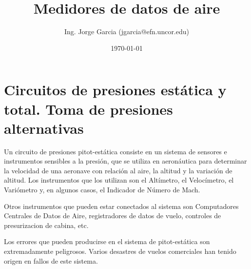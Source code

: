 \documentclass[a4paper,12pt,twoside]{article}
\title{Medidores de datos de aire}
\author{Ing. Jorge Garcia (jgarcia@efn.uncor.edu)}
\date{\today}
\begin{document}
\renewcommand{\tablename}{Tabla}

\newcommand{\ESPACIO}{\rule{0in}{3ex}}

\thispagestyle{fancy}
\maketitle

\thispagestyle{fancy}
\tableofcontents


\newpage

\section{Circuitos de presiones estática y total. Toma de presiones alternativas}
\label{sec:Circuitos.de.presiones}

Un circuito de presiones pitot-estática consiste en un sistema de sensores e instrumentos sensibles 
a la presi\'on, que se utiliza en aeron\'autica para determinar 
la velocidad de una aeronave con relaci\'on al aire, la altitud y la variaci\'on de altitud. 
Los instrumentos que los utilizan son el Alt\'imetro, el Veloc\'imetro, el Vari\'ometro y, 
en algunos casos, el Indicador de N\'umero de Mach.

Otros instrumentos que pueden estar conectados al sistema son Computadores Centrales de Datos de Aire, 
registradores de datos de vuelo, controles de presurizacion de cabina, etc.

Los errores que pueden producirse en el sistema de pitot-est\'atica son extremadamente peligrosos.
Varios desastres de vuelos comerciales han tenido origen en fallos de este sistema. 
\end{document}
